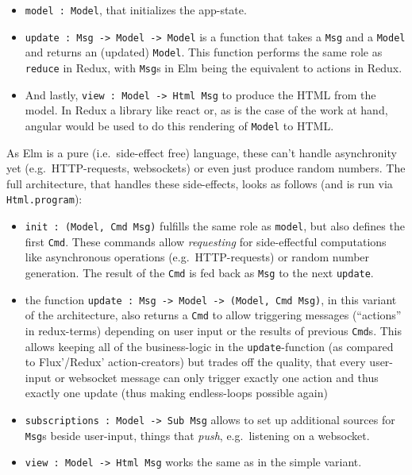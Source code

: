 \documentclass[a4paper,,tablecaptionabove]{scrbook}
\newcommand{\passthrough}[1]{#1}
\providecommand{\tightlist}{%
  \setlength{\itemsep}{0pt}\setlength{\parskip}{0pt}}
\begin{document}
\begin{itemize}
\tightlist
\item
  \passthrough{\lstinline!model : Model!}, that initializes the
  app-state.
\item
  \passthrough{\lstinline!update : Msg -> Model -> Model!} is a function
  that takes a \passthrough{\lstinline!Msg!} and a
  \passthrough{\lstinline!Model!} and returns an (updated)
  \passthrough{\lstinline!Model!}. This function performs the same role
  as \passthrough{\lstinline!reduce!} in Redux, with
  \passthrough{\lstinline!Msg!}s in Elm being the equivalent to actions
  in Redux.
\item
  And lastly, \passthrough{\lstinline!view : Model -> Html Msg!} to
  produce the HTML from the model. In Redux a library like react or, as
  is the case of the work at hand, angular would be used to do this
  rendering of \passthrough{\lstinline!Model!} to HTML.
\end{itemize}

As Elm is a pure (i.e.~side-effect free) language, these can't handle
asynchronity yet (e.g.~HTTP-requests, websockets) or even just produce
random numbers. The full architecture, that handles these side-effects,
looks as follows (and is run via
\passthrough{\lstinline!Html.program!}):

\begin{itemize}
\tightlist
\item
  \passthrough{\lstinline!init : (Model, Cmd Msg)!} fulfills the same
  role as \passthrough{\lstinline!model!}, but also defines the first
  \passthrough{\lstinline!Cmd!}. These commands allow \emph{requesting}
  for side-effectful computations like asynchronous operations
  (e.g.~HTTP-requests) or random number generation. The result of the
  \passthrough{\lstinline!Cmd!} is fed back as
  \passthrough{\lstinline!Msg!} to the next
  \passthrough{\lstinline!update!}.
\item
  the function
  \passthrough{\lstinline!update : Msg -> Model -> (Model, Cmd Msg)!},
  in this variant of the architecture, also returns a
  \passthrough{\lstinline!Cmd!} to allow triggering messages
  (\enquote{actions} in redux-terms) depending on user input or the
  results of previous \passthrough{\lstinline!Cmd!}s. This allows
  keeping all of the business-logic in the
  \passthrough{\lstinline!update!}-function (as compared to Flux'/Redux'
  action-creators) but trades off the quality, that every user-input or
  websocket message can only trigger exactly one action and thus exactly
  one update (thus making endless-loops possible again) 
\item
  \passthrough{\lstinline!subscriptions : Model -> Sub Msg!} allows to
  set up additional sources for \passthrough{\lstinline!Msg!}s beside
  user-input, things that \emph{push}, e.g.~listening on a websocket.
\item
  \passthrough{\lstinline!view : Model -> Html Msg!} works the same as
  in the simple variant.
\end{itemize}
\end{document}
